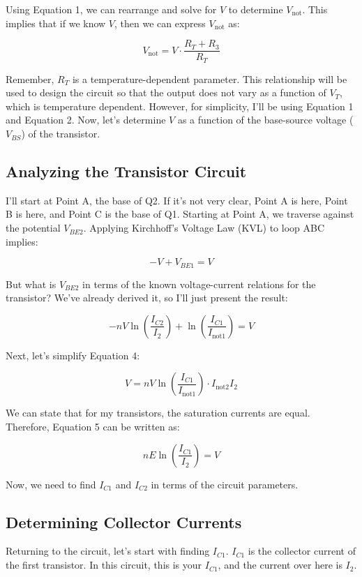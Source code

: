 Using Equation 1, we can rearrange and solve for \( V \) to determine \( V_{\text{not}} \). This implies that if we know \( V \), then we can express \( V_{\text{not}} \) as:

\[
V_{\text{not}} = V \cdot \frac{R_T + R_3}{R_T}
\]

Remember, \( R_T \) is a temperature-dependent parameter. This relationship will be used to design the circuit so that the output does not vary as a function of \( V_T \), which is temperature dependent. However, for simplicity, I'll be using Equation 1 and Equation 2. Now, let's determine \( V \) as a function of the base-source voltage (\( V_{BS} \)) of the transistor.

\subsection*{Analyzing the Transistor Circuit}

I'll start at Point A, the base of Q2. If it's not very clear, Point A is here, Point B is here, and Point C is the base of Q1. Starting at Point A, we traverse against the potential \( V_{BE2} \). Applying Kirchhoff's Voltage Law (KVL) to loop ABC implies:

\[
-V + V_{BE1} = V
\]

But what is \( V_{BE2} \) in terms of the known voltage-current relations for the transistor? We've already derived it, so I'll just present the result:

\[
-n V \ln\left(\frac{I_{C2}}{I_2}\right) + \ln\left(\frac{I_{C1}}{I_{\text{not1}}}\right) = V
\]

Next, let's simplify Equation 4:

\[
V = n V \ln\left(\frac{I_{C1}}{I_{\text{not1}}}\right) \cdot I_{\text{not2}} I_2
\]

We can state that for my transistors, the saturation currents are equal. Therefore, Equation 5 can be written as:

\[
n E \ln\left(\frac{I_{C1}}{I_2}\right) = V
\]

Now, we need to find \( I_{C1} \) and \( I_{C2} \) in terms of the circuit parameters.

\subsection*{Determining Collector Currents}

Returning to the circuit, let's start with finding \( I_{C1} \). \( I_{C1} \) is the collector current of the first transistor. In this circuit, this is your \( I_{C1} \), and the current over here is \( I_2 \).

